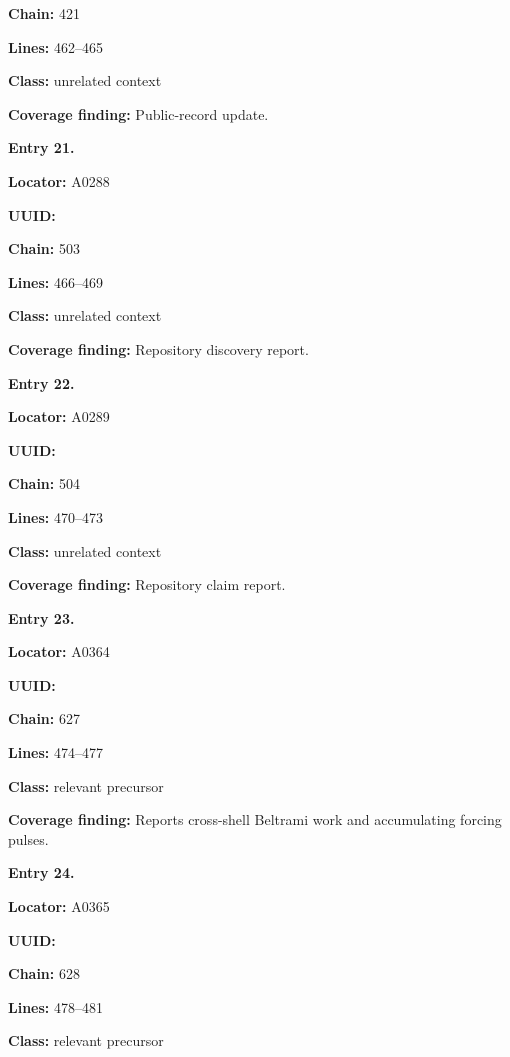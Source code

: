 \documentclass[10pt,a4paper,oneside]{report}
\begin{document}
\textbf{Chain:} 421

\textbf{Lines:} 462--465

\textbf{Class:} unrelated context

\textbf{Coverage finding:} Public-record update.


\textbf{Entry 21.}

\textbf{Locator:} A0288

\textbf{UUID:} \protect{}

\textbf{Chain:} 503

\textbf{Lines:} 466--469

\textbf{Class:} unrelated context

\textbf{Coverage finding:} Repository discovery report.


\textbf{Entry 22.}

\textbf{Locator:} A0289

\textbf{UUID:} \protect{}

\textbf{Chain:} 504

\textbf{Lines:} 470--473

\textbf{Class:} unrelated context

\textbf{Coverage finding:} Repository claim report.


\textbf{Entry 23.}

\textbf{Locator:} A0364

\textbf{UUID:} \protect{}

\textbf{Chain:} 627

\textbf{Lines:} 474--477

\textbf{Class:} relevant precursor

\textbf{Coverage finding:} Reports cross-shell Beltrami work and
accumulating forcing pulses.


\textbf{Entry 24.}

\textbf{Locator:} A0365

\textbf{UUID:} \protect{}

\textbf{Chain:} 628

\textbf{Lines:} 478--481

\textbf{Class:} relevant precursor
\end{document}
